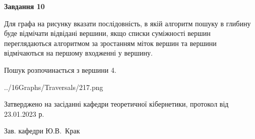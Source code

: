 \documentclass[12pt, ukrainian]{article}
\begin{document}
{\begin {large}
{\begin {center}\textbf{Завдання 10}\end {center}}\par
Для графа на рисунку вказати послідовність, в якій алгоритм пошуку в глибину буде відмічати відвідані вершини, якщо списки суміжності вершин переглядаються алгоритмом за зростанням міток вершин та вершини відмічаються на першому вход\-женні у вершину.\par
Пошук розпочинається з вершини 4.\par

\begin{center}
	{../16Graphs/Traversals/217.png}
\end{center}\par
\newpage


\end {large}
}
{\smallskip \begin {small} Затверджено на засіданні кафедри теоретичної кібернетики, протокол  від   23.01.2023 р.\par\smallskip\smallskip
{\parbox {6.5 cm}{Зав. кафедри \dotfill Ю.В.~Крак}} \end{small}}
\end{document}
